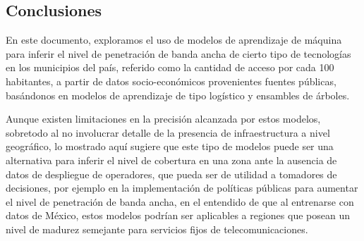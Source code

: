\documentclass[9pt,twocolumn,twoside]{ilcss}
\begin{document}
\subsection{Conclusiones}

En este documento, exploramos el uso de modelos de aprendizaje de máquina para inferir el nivel de penetración de banda ancha de cierto tipo de tecnologías en los municipios del país, referido como la cantidad de acceso por cada 100 habitantes, a partir de datos socio-económicos provenientes fuentes públicas, basándonos en modelos de aprendizaje de tipo logístico y ensambles de árboles.

Aunque existen limitaciones en la precisión alcanzada por estos modelos, sobretodo al no involucrar detalle de la presencia de infraestructura a nivel geográfico, lo mostrado aquí sugiere que este tipo de modelos puede ser una alternativa para inferir el nivel de cobertura en una zona ante la ausencia de datos de despliegue de operadores, que pueda ser de utilidad a tomadores de decisiones, por ejemplo en la implementación de políticas públicas para aumentar el nivel de penetración de banda ancha, en el entendido de que al entrenarse con datos de México, estos modelos podrían ser aplicables a regiones que posean un nivel de madurez semejante para servicios fijos de telecomunicaciones.



\end{document}
